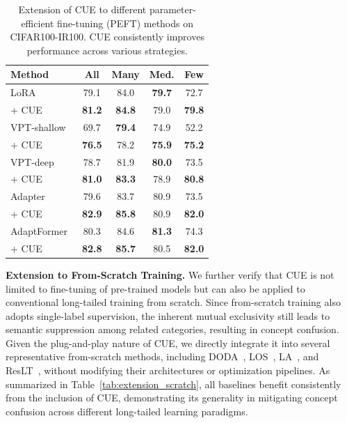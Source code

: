 \begin{table}[!t]
\centering
\caption{Extension of CUE to different parameter-efficient fine-tuning (PEFT) methods on CIFAR100-IR100. CUE consistently improves performance across various               strategies.}
\label{tab:extension_peft}
\small
\begin{tabular}{l|cccc}
\toprule
\textbf{Method} & \textbf{All} & \textbf{Many} & \textbf{Med.} & \textbf{Few} \\
\midrule
LoRA~\cite{hu2022lora} & 79.1 & 84.0 & \textbf{79.7} & 72.7 \\
+ CUE & \textbf{81.2} & \textbf{84.8} & 79.0 & \textbf{79.8} \\
\midrule
VPT-shallow~\cite{jia2022visual} & 69.7 & \textbf{79.4} & 74.9 & 52.2 \\
+ CUE & \textbf{76.5} & 78.2 & \textbf{75.9} & \textbf{75.2} \\
\midrule
VPT-deep~\cite{jia2022visual} & 78.7 & 81.9 & \textbf{80.0} & 73.5 \\
+ CUE & \textbf{81.0} & \textbf{83.3} & 78.9 & \textbf{80.8} \\
\midrule
Adapter~\cite{houlsby2019parameter} & 79.6 & 83.7 & 80.9 & 73.5 \\
+ CUE & \textbf{82.9} & \textbf{85.8} & 80.9 & \textbf{82.0} \\
\midrule
AdaptFormer~\cite{chen2022adaptformer} & 80.3 & 84.6 & \textbf{81.3} & 74.3 \\
+ CUE & \textbf{82.8} & \textbf{85.7} & 80.5 & \textbf{82.0} \\

\bottomrule
\end{tabular}
\vspace{-1.5em}
\end{table}



\vspace{0.5em}

\noindent \textbf{Extension to From-Scratch Training.}
We further verify that CUE is not limited to fine-tuning of pre-trained models but can also be applied to conventional long-tailed training from scratch. 
Since from-scratch training also adopts single-label supervision, the inherent mutual exclusivity still leads to semantic suppression among related categories, resulting in concept confusion. 
Given the plug-and-play nature of CUE, we directly integrate it into several representative from-scratch methods, including DODA~\cite{wang2024kill}, LOS~\cite{sun2025rethinking}, LA~\cite{menon2021longtail}, and ResLT~\cite{cui2022reslt}, without modifying their architectures or optimization pipelines. 
As summarized in Table~\ref{tab:extension_scratch}, all baselines benefit consistently from the inclusion of CUE, demonstrating its generality in mitigating concept confusion across different long-tailed learning paradigms.

